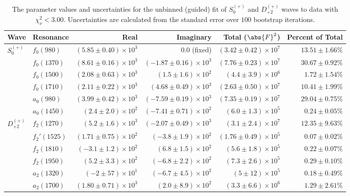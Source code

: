 \begin{table}[ht]
    \begin{center}
        \begin{tabular}{llrrrr}\toprule
        Wave & Resonance & Real & Imaginary & Total ($\abs{F}^2$) & Percent of Total \\\midrule
$S_{0}^{(+)}$ & $f_{0}(980)$ & $(5.85 \pm 0.40) \times 10^{3}$ & $0.0$ (fixed) & $(3.42 \pm 0.42) \times 10^{7}$ & $13.51 \pm 1.66 \%$ \\
 & $f_{0}(1370)$ & $(8.61 \pm 0.16) \times 10^{3}$ & $(-1.87 \pm 0.16) \times 10^{3}$ & $(7.76 \pm 0.23) \times 10^{7}$ & $30.67 \pm 0.92 \%$ \\
 & $f_{0}(1500)$ & $(2.08 \pm 0.63) \times 10^{3}$ & $(1.5 \pm 1.6) \times 10^{2}$ & $(4.4 \pm 3.9) \times 10^{6}$ & $1.72 \pm 1.54 \%$ \\
 & $f_{0}(1710)$ & $(2.11 \pm 0.22) \times 10^{3}$ & $(4.68 \pm 0.49) \times 10^{3}$ & $(2.63 \pm 0.50) \times 10^{7}$ & $10.41 \pm 1.99 \%$ \\
 & $a_{0}(980)$ & $(3.99 \pm 0.42) \times 10^{3}$ & $(-7.59 \pm 0.19) \times 10^{3}$ & $(7.35 \pm 0.19) \times 10^{7}$ & $29.04 \pm 0.75 \%$ \\
 & $a_{0}(1450)$ & $(2.4 \pm 2.0) \times 10^{2}$ & $(-7.41 \pm 0.71) \times 10^{2}$ & $(6.0 \pm 1.3) \times 10^{5}$ & $0.24 \pm 0.05 \%$ \\
$D_{+2}^{(+)}$ & $f_{2}(1270)$ & $(5.2 \pm 1.6) \times 10^{3}$ & $(-2.07 \pm 0.49) \times 10^{3}$ & $(3.1 \pm 2.4) \times 10^{7}$ & $12.35 \pm 9.63 \%$ \\
 & $f_{2}'(1525)$ & $(1.71 \pm 0.75) \times 10^{2}$ & $(-3.8 \pm 1.9) \times 10^{2}$ & $(1.76 \pm 0.49) \times 10^{5}$ & $0.07 \pm 0.02 \%$ \\
 & $f_{2}(1810)$ & $(-3.1 \pm 1.2) \times 10^{2}$ & $(6.8 \pm 1.5) \times 10^{2}$ & $(5.6 \pm 1.8) \times 10^{5}$ & $0.22 \pm 0.07 \%$ \\
 & $f_{2}(1950)$ & $(5.2 \pm 3.3) \times 10^{2}$ & $(-6.8 \pm 2.2) \times 10^{2}$ & $(7.3 \pm 2.6) \times 10^{5}$ & $0.29 \pm 0.10 \%$ \\
 & $a_{2}(1320)$ & $(-2 \pm 57) \times 10^{1}$ & $(-6.7 \pm 4.5) \times 10^{2}$ & $(5 \pm 12) \times 10^{5}$ & $0.18 \pm 0.49 \%$ \\
 & $a_{2}(1700)$ & $(1.80 \pm 0.71) \times 10^{3}$ & $(2.0 \pm 8.9) \times 10^{2}$ & $(3.3 \pm 6.6) \times 10^{6}$ & $1.29 \pm 2.61 \%$ \\\bottomrule
        \end{tabular}
    \caption{The parameter values and uncertainties for the unbinned (guided) fit of $S_{0}^{(+)}$ and $D_{+2}^{(+)}$ waves to data with $\chi^2_\nu < 3.00$. Uncertainties are calculated from the standard error over $100$ bootstrap iterations.}\label{tab:unbinned-fit-chisqdof-3.0-guided-Sp0p-Dp2p}
    \end{center}
\end{table}
